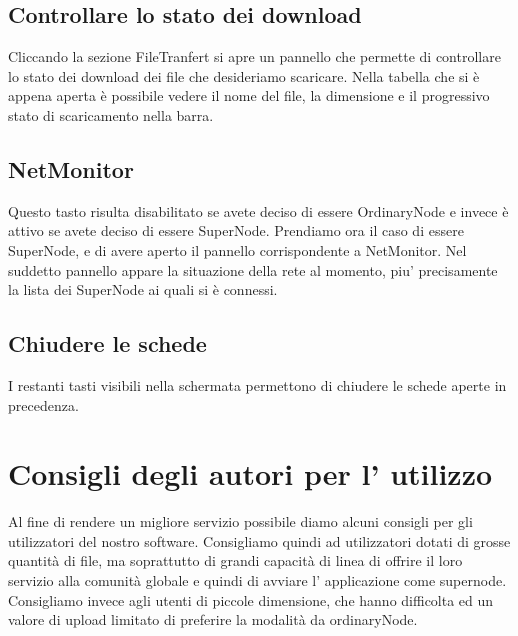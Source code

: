 	\subsection{Controllare lo stato dei download}
Cliccando la sezione FileTranfert si apre un pannello che permette di controllare lo stato dei download dei file che desideriamo scaricare.
Nella tabella che si è appena aperta è possibile vedere il nome del file, la dimensione e il progressivo stato di scaricamento nella barra.

	\subsection{NetMonitor}
Questo tasto risulta disabilitato se avete deciso di essere OrdinaryNode e invece è attivo se avete deciso di essere SuperNode.
Prendiamo ora il caso di essere SuperNode, e di avere aperto il pannello corrispondente a NetMonitor.
Nel suddetto pannello appare la situazione della rete al momento, piu' precisamente la lista dei SuperNode ai quali si è connessi.


	\subsection{Chiudere le schede}
I restanti tasti visibili nella schermata permettono di chiudere le schede aperte in precedenza.

	\section{Consigli degli autori per l' utilizzo}
Al fine di rendere un migliore servizio possibile diamo alcuni consigli per gli utilizzatori del nostro software.
Consigliamo quindi ad utilizzatori dotati di grosse quantità di file, ma soprattutto di grandi capacità di linea di offrire il loro servizio alla comunità globale e quindi di avviare l' applicazione come supernode.
Consigliamo invece agli utenti di piccole dimensione, che hanno difficolta ed un valore di upload limitato di preferire la modalità da ordinaryNode.
  
